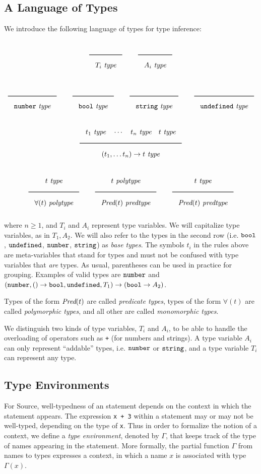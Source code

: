 \subsection{A Language of Types}
\label{simpltyped}

We introduce the following language of types for type inference:

\[
\Rule{}{T_i\ \type}
\qquad
\Rule{}{A_i\ \type}
\]

\[
\Rule{}{\Number\ \type}
\qquad
\Rule{}{\Bool\ \type}
\qquad
\Rule{}{\String\ \type}
\qquad
\Rule{}{\Undefined\ \type}
\]

\[ \Rule{t_1\ \type \quad \cdots\quad t_n\ \type\quad t\ \type}{(t_1, \ldots t_n) \rightarrow t\ \type}
\]

\[
\Rule{t\ \type}{\forall ( t )\ \polytype}
\qquad
\Rule{t\ \polytype}{\Pred(t)\ \predtype}
\qquad
\Rule{t\ \type}{\Pred(t)\ \predtype}
\]

\noindent
where $n \geq 1$, and $T_i$ and $A_i$ represent type variables. We will capitalize 
type variables, as in $T_1, A_2$. We will also refer to the types in the second row (i.e. $\texttt{bool}$,
$\texttt{undefined}$, $\texttt{number}$, $\texttt{string}$) as \emph{base types}. The symbols $t_i$ in the rules above
are meta-variables that stand for types and must not be confused with type variables
that \emph{are} types.
As usual, parentheses can be used in practice for grouping.
Examples of valid types are $\texttt{number}$ and
$(\texttt{number}, () \rightarrow \texttt{bool}, \texttt{undefined}, T_1) \rightarrow (\texttt{bool} \rightarrow A_2)$.

Types of the form $\textit{Pred} ( t )$ are called \emph{predicate types},
types of the form $\forall ( t )$ are called \emph{polymorphic types},
and all other are called \emph{monomorphic types}.

We distinguish two kinds of type variables, $T_i$ and $A_i$, to be able to handle
the overloading of operators such as \texttt{+} (for numbers and strings).
A type variable $A_i$ can only
represent ``addable'' types, i.e. 
$\texttt{number}$ or $\texttt{string}$, and
a type variable $T_i$ can represent any type.

\subsection{Type Environments}

For Source, well-typedness of an statement depends on the context in which the
statement appears. The expression \verb#x + 3# within a statement may or may 
not be well-typed, depending on the type of \verb#x#. Thus in order 
to formalize the notion of a context, we define a 
\emph{type environment}, denoted by $\Gamma$, that keeps track
of the type of names appearing in the statement. More
formally,
the partial function $\Gamma$ from names to types expresses a 
context, in which a name $x$ is associated with type $\Gamma(x)$. 

